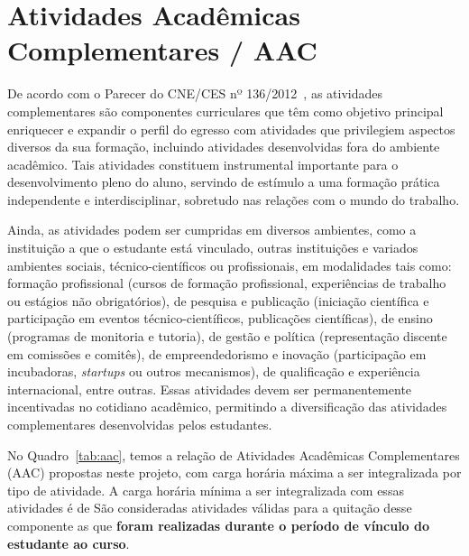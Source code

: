 \section{Atividades Acadêmicas Complementares / AAC}
\label{sec:AAC}

De acordo com o Parecer do CNE/CES nº 136/2012~\cite{MEC:CNE:CES:136:2012}, as atividades complementares são componentes curriculares que têm como objetivo principal enriquecer e expandir o perfil do egresso com atividades que privilegiem aspectos diversos da sua formação, incluindo atividades desenvolvidas fora do ambiente acadêmico. Tais atividades constituem instrumental importante para o desenvolvimento pleno do aluno, servindo de estímulo a uma formação prática independente e interdisciplinar, sobretudo nas relações com o mundo do trabalho.

Ainda, as atividades podem ser cumpridas em diversos ambientes, como a instituição a que o estudante está vinculado, outras instituições e variados ambientes sociais, técnico-científicos ou profissionais, em modalidades tais como: formação profissional (cursos de formação profissional, experiências de trabalho ou estágios não obrigatórios), de pesquisa e publicação (iniciação científica e participação em eventos técnico-científicos, publicações científicas), de ensino (programas de monitoria e tutoria), de gestão e política (representação discente em comissões e comitês), de empreendedorismo e inovação (participação em incubadoras, \textit{startups} ou outros mecanismos), de qualificação e experiência internacional, entre outras. Essas atividades devem ser permanentemente incentivadas no cotidiano acadêmico, permitindo a diversificação das atividades complementares desenvolvidas pelos estudantes.

No Quadro~\ref{tab:aac}, temos a relação de Atividades Acadêmicas Complementares (AAC) propostas neste projeto, com carga horária máxima a ser integralizada por tipo de atividade. A carga horária mínima a ser integralizada com essas atividades é de  São consideradas atividades válidas para a quitação desse componente as que \textbf{foram realizadas durante o período de vínculo do estudante ao curso}.

